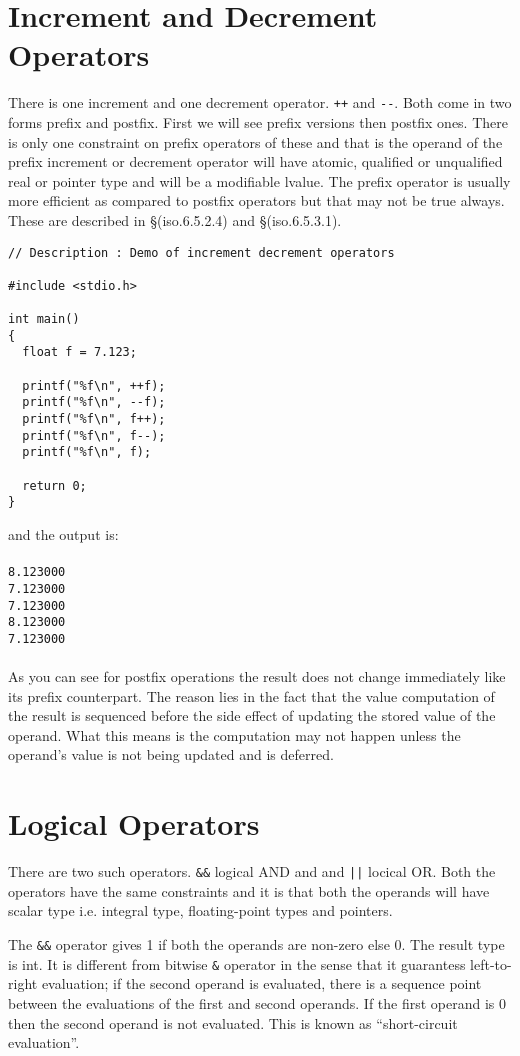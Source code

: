 \section{Increment and Decrement Operators}
There is one increment and one decrement operator. \texttt{++} and
\texttt{{-}{-}}. Both come in two forms prefix and postfix. First we will see
prefix versions then postfix ones. There is only one constraint on prefix
operators of these and that is the operand of the prefix increment or decrement
operator will have atomic, qualified or unqualified real or pointer type and
will be a modifiable lvalue. The prefix operator is usually more efficient as
compared to postfix operators but that may not be true always. These are
described in \S(iso.6.5.2.4) and \S(iso.6.5.3.1).
\begin{verbatim}
// Description : Demo of increment decrement operators

#include <stdio.h>

int main()
{
  float f = 7.123;

  printf("%f\n", ++f);
  printf("%f\n", --f);
  printf("%f\n", f++);
  printf("%f\n", f--);
  printf("%f\n", f);

  return 0;
}
\end{verbatim}
and the output is:
\\\\\texttt{8.123000\\
7.123000\\
7.123000\\
8.123000\\
7.123000\\\\}
As you can see for postfix operations the result does not change immediately
like its prefix counterpart. The reason lies in the fact that the value
computation of the result is sequenced before the side effect of updating the
stored value of the operand. What this means is the computation may not happen
unless the operand's value is not being updated and is deferred.

\section{Logical Operators}
There are two such operators. \texttt{\&\&} logical AND and
and \texttt{||} locical OR. Both the operators have the same constraints and it
is that both the operands will have scalar type i.e. integral type,
floating-point types and pointers.

The \texttt{\&\&} operator gives 1 if both the operands are non-zero else
0. The result type is int. It is different from bitwise \texttt{\&} operator in
the sense that it guarantess left-to-right evaluation; if the second operand is
evaluated, there is a sequence point between the evaluations of the first and
second operands. If the first operand is 0 then the second operand is not
evaluated. This is known as ``short-circuit evaluation''.

